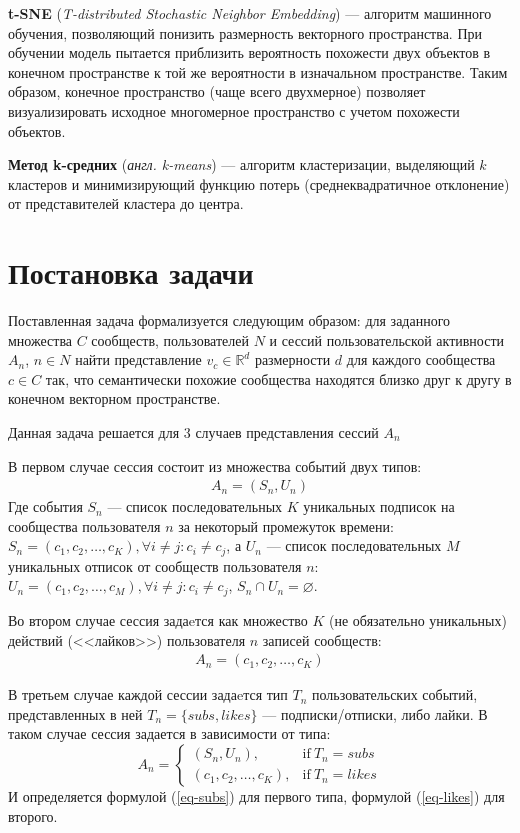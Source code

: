 \documentclass[times,specification,annotation]{itmo-student-thesis}
\begin{document}
\textbf{t-SNE} (\textit{T-distributed Stochastic Neighbor Embedding})\cite{maaten2008visualizing} --- алгоритм машинного обучения, позволяющий понизить размерность векторного пространства. При обучении модель пытается приблизить вероятность похожести двух объектов в конечном пространстве к той же вероятности в изначальном пространстве. Таким образом, конечное пространство (чаще всего двухмерное) позволяет визуализировать исходное многомерное пространство с учетом похожести объектов. 

\textbf{Метод k-средних} (\textit{англ. k-means})\cite{lloyd1982least} --- алгоритм кластеризации, выделяющий $k$ кластеров и минимизирующий функцию потерь (среднеквадратичное отклонение) от представителей кластера до центра.  

\section{Постановка задачи}\label{sec:intro}

Поставленная задача формализуется следующим образом: для заданного множества $C$ сообществ, пользователей $N$ и сессий пользовательской активности $A_n$, $n \in N$ найти представление $v_{c} \in \mathbb{R}^d$ размерности $d$ для каждого сообщества $c \in C$ так, что семантически похожие сообщества находятся близко друг к другу в конечном векторном пространстве. 

Данная задача решается для 3 случаев представления сессий $A_n$
 
В первом случае сессия состоит из множества событий двух типов:
 \begin{align}
A_n = (S_n, U_n) 
\label{eq-subs}
\end{align}
Где события $S_n$ --- список последовательных $K$ уникальных подписок на сообщества пользователя $n$ за некоторый промежуток времени: $S_n = (c_{1}, c_{2}, \dots, c_{K}), \forall i \ne j : c_i \ne c_j$, а $U_n$ --- список последовательных $M$ уникальных отписок от сообществ пользователя $n$: $U_n = (c_{1},  c_{2}, \dots, c_{M}), \forall i \ne j : c_i \ne c_j$, $S_n \cap U_n = \varnothing$.

Во втором случае сессия задаeтся как множество $K$ (не обязательно уникальных) действий (<<лайков>>) пользователя $n$ записей сообществ:
 \begin{align}
A_n = (c_{1}, c_{2}, \dots, c_{K}) 
\label{eq-likes}
\end{align}
 
В третьем случае каждой сессии задаeтся тип $T_n$ пользовательских событий, представленных в ней $T_n = \{subs, likes\}$ --- подписки/отписки, либо лайки. В таком случае сессия задается в зависимости от типа:
\begin{equation}
    A_n =
    \begin{cases}
      (S_n, U_n), & \text{if}\ T_n=subs \\
      (c_{1}, c_{2}, \dots, c_{K}), & \text{if}\ T_n=likes
    \end{cases}  
    \label{eq-combined}
  \end{equation}
 И определяется формулой (\ref{eq-subs}) для первого типа, формулой (\ref{eq-likes}) для второго.
\end{document}
